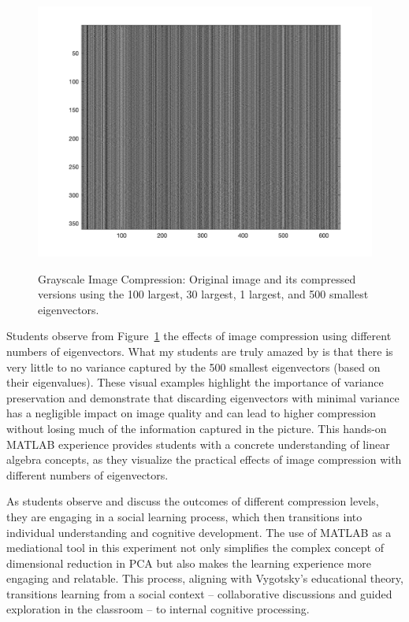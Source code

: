 \documentclass{article}
\begin{document}
\begin{figure}[H]
\begin{minipage}{0.18\textwidth}
        \includegraphics[width=\linewidth]{pictures/compression5.png}
        \label{fig:image51}
    \end{minipage}
    \caption{Grayscale Image Compression: Original image and its compressed versions using the 100 largest, 30 largest, 1 largest, and 500 smallest eigenvectors.}
    \label{fig:five_images}
\end{figure}
Students observe from Figure~\ref{fig:five_images} the effects of image compression using different numbers of eigenvectors.
What my students are truly amazed by is that there is very little to no variance captured by the 500 smallest eigenvectors (based on their eigenvalues). 
These visual examples highlight the importance of variance preservation and demonstrate that discarding eigenvectors with minimal variance has a negligible impact on image quality and can lead to higher compression without losing much of the information captured in the picture.
This hands-on MATLAB experience provides students with a concrete understanding of linear algebra concepts, as they visualize the practical effects of image compression with different numbers of eigenvectors.

As students observe and discuss the outcomes of different compression levels, they are engaging in a social learning process, which then transitions into individual understanding and cognitive development. 
The use of MATLAB as a mediational tool in this experiment not only simplifies the complex concept of dimensional reduction in PCA but also makes the learning experience more engaging and relatable. 
This process, aligning with Vygotsky's educational theory, transitions learning from a social context – collaborative discussions and guided exploration in the classroom – to internal cognitive processing. 
\end{document}
